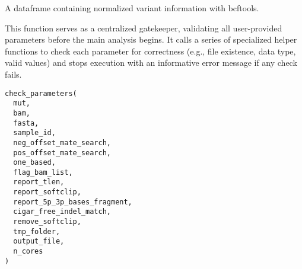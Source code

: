 \documentclass[a4paper]{book}
\begin{document}
%
\begin{Value}
A dataframe containing normalized variant information with bcftools.
\end{Value}
%
\begin{Description}
This function serves as a centralized gatekeeper, validating all user-provided parameters before the main
analysis begins. It calls a series of specialized  helper functions to check each parameter for correctness (e.g., file existence,
data type, valid values) and stops execution with an informative error message if any check fails.
\end{Description}
%
\begin{Usage}
\begin{verbatim}
check_parameters(
  mut,
  bam,
  fasta,
  sample_id,
  neg_offset_mate_search,
  pos_offset_mate_search,
  one_based,
  flag_bam_list,
  report_tlen,
  report_softclip,
  report_5p_3p_bases_fragment,
  cigar_free_indel_match,
  remove_softclip,
  tmp_folder,
  output_file,
  n_cores
)
\end{verbatim}
\end{Usage}
%
\end{document}
